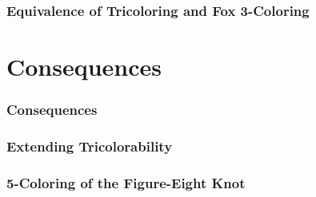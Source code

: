 \documentclass{beamer}
\begin{document}
\begin{frame}
  \frametitle{Equivalence of Tricoloring and Fox 3-Coloring}
  
\end{frame}

\section{Consequences}

\begin{frame}
  \frametitle{Consequences}
  
\end{frame}

\begin{frame}
  \frametitle{Extending Tricolorability}
  
\end{frame}

\begin{frame}
  \frametitle{5-Coloring of the Figure-Eight Knot}
  
\end{frame}
\end{document}

